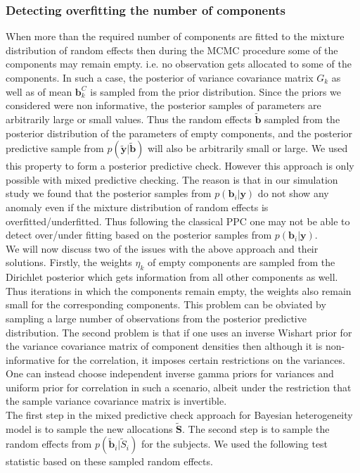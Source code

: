\subsubsection{Detecting overfitting the number of components}
When more than the required number of components are fitted to the mixture distribution of random effects then  during the MCMC procedure some of the components may remain empty. i.e. no observation gets allocated to some of the components. In such a case, the posterior of variance covariance matrix $G_k$ as well as of mean $\boldsymbol{b}_k^C$ is sampled from the prior distribution. Since the priors we considered were non informative, the posterior samples of parameters are arbitrarily large or small values. Thus the random effects $\boldsymbol{\tilde{b}}$ sampled from the posterior distribution of the parameters of empty components, and the posterior predictive sample from $p(\boldsymbol{\tilde{y}} | \boldsymbol{\tilde{b}})$ will also be arbitrarily small or large. We used this property to form a posterior predictive check. However this approach is only possible with mixed predictive checking. The reason is that in our simulation study we found that the posterior samples from $p(\boldsymbol{b}_i|\boldsymbol{y})$ do not show any anomaly even if the mixture distribution of random effects is overfitted/underfitted. Thus following the classical PPC one may not be able to detect over/under fitting based on the posterior samples from $p(\boldsymbol{b}_i|\boldsymbol{y})$.\\

We will now discuss two of the issues with the above approach and their solutions. Firstly, the weights $\eta_k$ of empty components are sampled from the Dirichlet posterior which gets information from all other components as well. Thus iterations in which the components remain empty, the weights also remain small for the corresponding components. This problem can be obviated by sampling a large number of observations from the posterior predictive distribution. The second problem is that if one uses an inverse Wishart prior for the variance covariance matrix of component densities then although it is non-informative for the correlation, it imposes certain restrictions on the variances. One can instead choose independent inverse gamma priors for variances and uniform prior for correlation in such a scenario, albeit under the restriction that the sample variance covariance matrix is invertible.\\

 The first step in the mixed predictive check approach for Bayesian heterogeneity model is to sample the new allocations $\boldsymbol{\tilde{S}}$. The second step is to sample the random effects from $p(\boldsymbol{\tilde{b}}_i|\tilde{S}_i)$ for the subjects. We used the following test statistic based on these sampled random effects.

